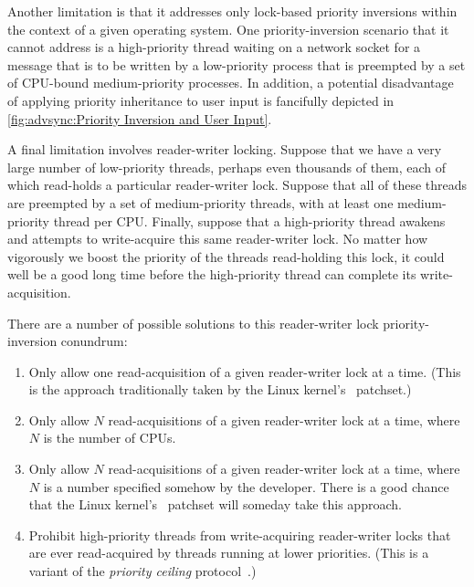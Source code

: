 Another limitation is that it addresses only lock-based priority
inversions within the context of a given operating system.
One priority-inversion scenario that it cannot address is a high-priority
thread waiting on a network socket for a message that is to be written
by a low-priority process that is preempted by a set of CPU-bound
medium-priority processes.
In addition, a potential disadvantage of applying priority inheritance
to user input is fancifully depicted in
\cref{fig:advsync:Priority Inversion and User Input}.

A final limitation involves reader-writer locking.
Suppose that we have a very large number of low-priority threads, perhaps
even thousands of them, each
of which read-holds a particular reader-writer lock.
Suppose that all of these threads are preempted by a set of medium-priority
threads, with at least one medium-priority thread per CPU\@.
Finally, suppose that a high-priority thread awakens and attempts to
write-acquire this same reader-writer lock.
No matter how vigorously we boost the priority of the threads read-holding
this lock, it could well be a good long time before the high-priority
thread can complete its write-acquisition.

There are a number of possible solutions to this reader-writer lock
priority-inversion conundrum:

\begin{enumerate}
\item	Only allow one read-acquisition of a given reader-writer lock
	at a time.  (This is the approach traditionally taken by
	the Linux kernel's \rt\ patchset.)
\item	Only allow $N$ read-acquisitions of a given reader-writer lock
	at a time, where $N$ is the number of CPUs.
\item	Only allow $N$ read-acquisitions of a given reader-writer lock
	at a time, where $N$ is a number specified somehow by the
	developer.
	There is a good chance that the Linux kernel's \rt\ patchset
	will someday take this approach.
\item	Prohibit high-priority threads from write-acquiring reader-writer
	locks that are ever read-acquired by threads running at lower
	priorities.
	(This is a variant of the \emph{priority ceiling}
	protocol~\cite{LuiSha1990PriorityInheritance}.)
\end{enumerate}

